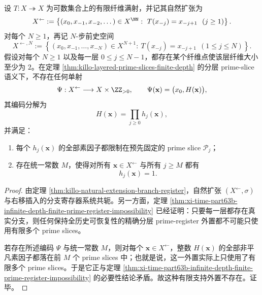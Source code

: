 \begin{theorem}\label{thm:xi-time-part74-natural-extension-finite-support-primeslice-impossibility}
设 \(T:X\twoheadrightarrow X\) 为可数集合上的有限纤维满射，并记其自然扩张为
\[
X^{\leftarrow}
:=
\left\{
(x_0,x_{-1},x_{-2},\dots)\in X^{\NN}:\ T(x_{-j})=x_{-j+1}\ \ (j\ge 1)
\right\}.
\]
对每个 \(N\ge 1\)，再记 \(N\)-步前史空间
\[
X^{\leftarrow,N}
:=
\left\{
(x_0,x_{-1},\dots,x_{-N})\in X^{N+1}:\ T(x_{-j})=x_{-j+1}\ \ (1\le j\le N)
\right\}.
\]
假设对每个 \(N\ge 1\) 以及每一层 \(0\le j\le N-1\)，都存在某个纤维点使该层纤维大小至少为 \(2\)。在定理 \ref{thm:killo-layered-prime-slices-finite-depth} 的分层 prime-slice 语义下，不存在任何单射
\[
\Psi:X^{\leftarrow}\longrightarrow X\times \ZZ_{>0},
\qquad
\Psi(\mathbf x)=\bigl(x_0,H(\mathbf x)\bigr),
\]
其编码分解为
\[
H(\mathbf x)=\prod_{j\ge 0}h_j(\mathbf x),
\]
并满足：
\begin{enumerate}
  \item 每个 \(h_j(\mathbf x)\) 的全部素因子都限制在预先固定的 prime slice \(\mathcal P_j\)；
  \item 存在统一常数 \(M\)，使得对所有 \(\mathbf x\in X^{\leftarrow}\) 与所有 \(j\ge M\) 都有
  \[
  h_j(\mathbf x)=1.
  \]
\end{enumerate}
\end{theorem}
\begin{proof}
由定理 \ref{thm:killo-natural-extension-branch-register}，自然扩张 \((X^{\leftarrow},\sigma)\) 与右移插入的分支寄存器系统共轭。另一方面，定理 \ref{thm:xi-time-part63b-infinite-depth-finite-prime-register-impossibility} 已经证明：只要每一层都存在真实分支，则任何保持全历史可恢复性的精确分层 prime-register 外置都不可能只使用有限多个 prime slices。

若存在所述编码 \(\Psi\) 与统一常数 \(M\)，则对每个 \(\mathbf x\in X^{\leftarrow}\)，整数 \(H(\mathbf x)\) 的全部非平凡素因子都落在前 \(M\) 个 prime slices 中；也就是说，这一外置实际上只使用了有限多个 prime slices。于是它正与定理 \ref{thm:xi-time-part63b-infinite-depth-finite-prime-register-impossibility} 的必要性结论矛盾。故这种有限支持外置不存在。证毕。
\end{proof}

